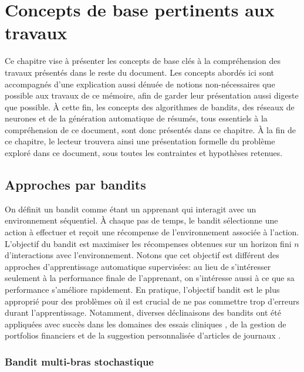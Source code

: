 \chapter{Concepts de base pertinents aux travaux}     %
\label{chap:prerequis}                   %

Ce chapitre vise à présenter les concepts de base clés à la compréhension des travaux
présentés dans le reste du document.
Les concepts abordés ici sont accompagnés d'une explication aussi dénuée de notions
non-nécessaires que possible aux travaux de ce mémoire, afin de garder leur présentation
aussi digeste que possible.
À cette fin, les concepts des algorithmes de bandits, des réseaux de neurones et de la
génération automatique de résumés, tous essentiels à la compréhension de ce document,
sont donc présentés dans ce chapitre.
À la fin de ce chapitre, le lecteur trouvera ainsi une présentation formelle du
problème exploré dans ce document, sous toutes les contraintes et hypothèses retenues.

\section{Approches par bandits}
\label{sec:bandits}

On définit un bandit \citep{banditalgs} comme étant un apprenant qui interagit
avec un environnement séquentiel.
À chaque pas de temps, le bandit sélectionne une action à effectuer et
reçoit une récompense de l'environnement associée à l'action.
L'objectif du bandit est maximiser les récompenses obtenues sur un horizon
fini $n$ d'interactions avec l'environnement.
Notons que cet objectif est différent des approches d'apprentissage automatique
supervisées: au lieu de s'intéresser seulement à la performance finale de
l'apprenant, on s'intéresse aussi à ce que sa performance s'améliore
rapidement.
En pratique, l'objectif bandit est le plus approprié pour des problèmes
où il est crucial de ne pas commettre trop d'erreurs durant l'apprentissage.
Notamment, diverses déclinaisons des bandits ont été appliquées avec succès dans
les domaines des essais cliniques \citep{kuleshov2014algorithms}, de
la gestion de portfolios financiers \citep{10.5555/2832249.2832384} et
de la suggestion personnalisée d'articles de journaux \citep{Li_2010}.

\subsection{Bandit multi-bras stochastique}

